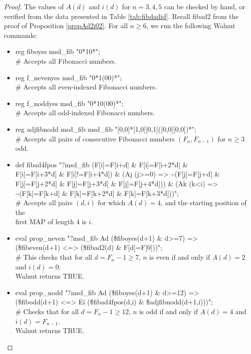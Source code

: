\documentclass[10pt,a4paper,reqno]{amsart}
\newcommand{\walnut}{{\ttfamily Walnut}}
\newcommand{\true}{{\ttfamily TRUE}}
\begin{document}
    \begin{proof}
    The values of $A(d)$ and $i(d)$ for $n=3,4,5$ can be checked by hand, or verified from the data presented in Table \ref{tab:fibdadid}. Recall {\ttfamily fibad2} from the proof of Proposition \ref{propAd2i02}.
    For all $n \geq 6$, we run the following \walnut{} commands:
\begin{itemize}
    \item {\ttfamily reg fiboyes msd\_fib "0*10*";\\\# Accepts all Fibonacci numbers.}
    \item {\ttfamily reg f\_nevenyes msd\_fib "0*1(00)*";\\\# Accepts all even-indexed Fibonacci numbers.}
    \item {\ttfamily reg f\_noddyes msd\_fib "0*10(00)*";\\\# Accepts all odd-indexed Fibonacci numbers.}
    \item {\ttfamily reg adjfibnodd msd\_fib msd\_fib "[0,0]*[1,0][0,1]([0,0][0,0])*";\\\# Accepts all pairs of consecutive Fibonacci numbers $(F_n,F_{n-1})$ for $n \geq 3$ odd.}
    \item {\ttfamily def fibad4fpos "?msd\_fib (F[i]=F[i+d] \& F[i]=F[i+2*d] \&\\ F[i]=F[i+3*d] \& F[i]!=F[i+4*d]) \& (Aj (j>=0) =>  \textasciitilde(F[j]=F[j+d] \&\\ F[j]=F[j+2*d] \& F[j]=F[j+3*d] \& F[j]=F[j+4*d])) \& (Ak (k<i) => \\\textasciitilde(F[k]=F[k+d] \& F[k]=F[k+2*d] \& F[k]=F[k+3*d]))";\\ 
    \# Accepts all pairs $(d,i)$ for which $A(d)=4$, and the starting position of the \\first MAP of length $4$ is $i$.}
	\item {\ttfamily eval prop\_neven "?msd\_fib Ad (\$fiboyes(d+1) \& d>=7) => \\(\$fibeven(d+1) <=> (\$fibad2(d) \& F[d]=F[0]))";\\ \# This checks that for all $d=F_n-1\geq 7$, $n$ is even if and only if $A(d)=2$ and $i(d)=0$.\\\walnut{} returns \true.}
        \item {\ttfamily eval prop\_nodd "?msd\_fib Ad (\$fiboyes(d+1) \& d>=12) => \\(\$fibodd(d+1) <=> Ei (\$fibad4fpos(d,i) \& \$adjfibnodd(d+1,i)))";\\\# Checks that for all $d=F_n-1\geq 12$, $n$ is odd if and only if $A(d)=4$ and $i(d)=F_{n-1}$.\\\walnut{} returns \true.}
\end{itemize}
    \end{proof}
\end{document}
